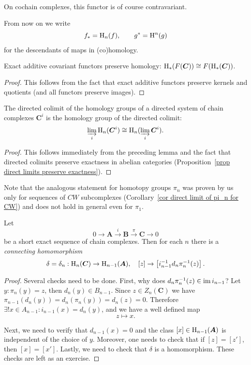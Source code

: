 \begin{rem}
    On cochain complexes, this functor is of course contravariant.
\end{rem}

From now on we write
\[f_\ast=\mathrm{H}_n(f),\quad\quad g^\ast=\mathrm{H}^n(g)\]
for the descendants of maps in (co)homology.

\begin{lem}
    Exact additive covariant functors preserve homology: $\mathrm{H}_\ast(F(\boldsymbol{C}))\cong F(\mathrm{H}_\ast(\boldsymbol{C}))$.
\end{lem}
\begin{proof}
    This follows from the fact that exact additive functors preserve kernels and quotients (and all functors preserve images).
\end{proof}

\begin{prop}
    The directed colimit of the homology groups of a directed system of chain complexes $\bm{C}^i$ is the homology group  of the directed colimit:
    \[\varinjlim_i \mathrm{H}_n(\boldsymbol{C}^i)\cong \mathrm{H}_n(\varinjlim_i \boldsymbol{C}^i).\]
\end{prop}
\begin{proof}
    This follows immediately from the preceding lemma and the fact that directed colimits preserve exactness in abelian categories (Proposition~\ref{prop direct limits preserve exactness}).
\end{proof}
\begin{rem}
    Note that the analogous statement for homotopy groups $\pi_n$ was proven by us only for sequences of $CW$ subcomplexes (Corollary~\ref{cor direct limit of pi_n for CW}) and does not hold in general even for $\pi_1$.
\end{rem}



\begin{thm}\label{connecting hom in homology}
    Let 
    \[0\to \bm{A}\overset i\to \bm{B}\overset\pi\to \bm{C}\to 0 \]
    be a short exact sequence of chain complexes. Then for each $n$ there is a \emph{connecting homomorphism}
    \[\delta=\delta_n:\mathrm{H}_n(\boldsymbol{C})\to \mathrm{H}_{n-1}(\boldsymbol{A}),\quad [z]\to \left[i_{n-1}^{-1} d_n\pi_n^{-1}(z)\right].\]
\end{thm}
\begin{proof}
    Several checks need to be done. First, why does $d_n\pi_n^{-1}(z)\in\operatorname{im} i_{n-1}$? Let $y:\pi_n(y)=z$, then $d_n(y)\in B_{n-1}$. Since $z\in Z_n(\bm{C})$ we have $\pi_{n-1}(d_n(y))=d_n(\pi_n(y))=d_n(z)=0$. Therefore $\exists ! x\in A_{n-1}:i_{n-1}(x)=d_n(y)$, and we have a well defined map
    \[z\mapsto x.\]
    
    Next, we need to verify that $d_{n-1}(x)=0$ and the class $[x]\in \mathrm{H}_{n-1}(\boldsymbol{A})$ is independent of the choice of $y$.
    Moreover, one needs to check that if $[z]=[z']$, then $[x]=[x']$. Lastly, we need to check that $\delta$ is a homomorphism. These checks are left as an exercise.
\end{proof}

